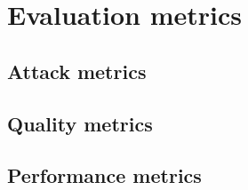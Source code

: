 \section{Evaluation metrics}\label{sec:evaluation-metrics}


\subsection{Attack metrics}\label{subsec:attack-metrics}


\subsection{Quality metrics}\label{subsec:quality-metrics}


\subsection{Performance metrics}\label{subsubsec:performance-metrics}

